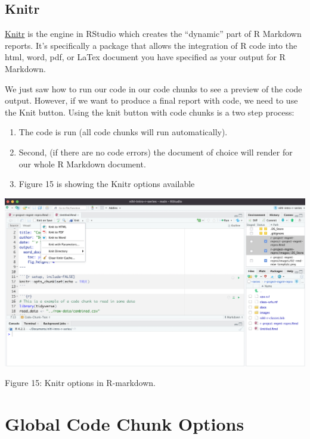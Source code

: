 \documentclass[
]{article}
\providecommand{\tightlist}{%
  \setlength{\itemsep}{0pt}\setlength{\parskip}{0pt}}
\begin{document}
\hypertarget{knitr}{%
\subsection{Knitr}\label{knitr}}

\href{https://yihui.org/knitr/}{Knitr} is the engine in RStudio which
creates the ``dynamic'' part of R Markdown reports. It's specifically a
package that allows the integration of R code into the html, word, pdf,
or LaTex document you have specified as your output for R Markdown.

We just saw how to run our code in our code chunks to see a preview of
the code output. However, if we want to produce a final report with
code, we need to use the Knit button. Using the knit button with code
chunks is a two step process:

\begin{enumerate}
\def\labelenumi{\arabic{enumi}.}
\tightlist
\item
  The code is run (all code chunks will run automatically).
\item
  Second, (if there are no code errors) the document of choice will
  render for our whole R Markdown document.
\item
  Figure 15 is showing the Knitr options available
\end{enumerate}

\includegraphics[width=6.5in,height=\textheight]{images/knit-01.png}

Figure 15: Knitr options in R-markdown.

\hypertarget{global-code-chunk-options}{%
\section{\texorpdfstring{\textbf{Global Code Chunk
Options}}{Global Code Chunk Options}}\label{global-code-chunk-options}}
\end{document}
